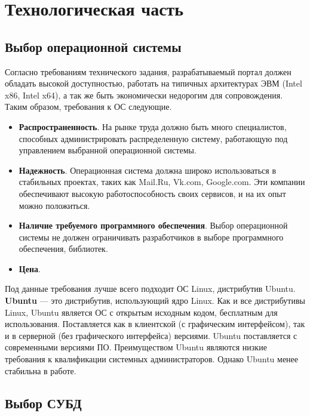 \chapter{Технологическая часть}

\section{Выбор операционной системы}

Согласно требованиям технического задания, разрабатываемый портал должен обладать высокой доступностью, работать на типичных архитектурах ЭВМ (Intel x86, Intel x64), а так же быть экономически недорогим для сопровождения. Таким образом, требования к ОС следующие.
\begin{itemize}
	\item \textbf{Распространенность}. На рынке труда должно быть много специалистов, способных администрировать распределенную систему, работающую под управлением выбранной операционной системы.
	\item \textbf{Надежность}. Операционная система должна широко использоваться в стабильных проектах, таких как Mail.Ru, Vk.com, Google.com. Эти компании обеспечивают высокую работоспособность своих сервисов, и на их опыт можно положиться.
	\item \textbf{Наличие требуемого программного обеспечения}. Выбор операционной системы не должен ограничивать разработчиков в выборе программного обеспечения, библиотек.
	\item \textbf{Цена}.
\end{itemize}
 
Под данные требования лучше всего подходит ОС Linux, дистрибутив Ubuntu. \textbf{Ubuntu} \cite{ubuntu} — это дистрибутив, использующий ядро Linux. Как и все дистрибутивы Linux, Ubuntu является ОС с открытым исходным кодом, бесплатным для использования. Поставляется как в клиентской (с графическим интерфейсом), так и в серверной (без графического интерфейса) версиями. Ubuntu поставляется с современными версиями ПО. Преимуществом Ubuntu являются низкие требования к квалификации системных администраторов. Однако Ubuntu менее стабильна в работе.


\section{Выбор СУБД}

